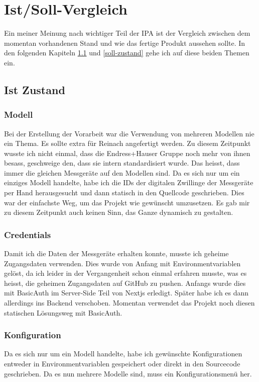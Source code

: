 \section{Ist/Soll-Vergleich}
Ein meiner Meinung nach wichtiger Teil der IPA ist der Vergleich zwischen dem momentan vorhandenen Stand und wie das fertige Produkt aussehen sollte. In den folgenden Kapiteln \ref{ist-zustand} und \ref{soll-zustand} gehe ich auf diese beiden Themen ein.
\subsection{Ist Zustand} \label{ist-zustand}
\subsubsection{Modell}
Bei der Erstellung der Vorarbeit war die Verwendung von mehreren Modellen nie ein Thema. Es sollte extra für Reinach angefertigt werden. Zu diesem Zeitpunkt wusste ich nicht einmal, dass die Endress+Hauser Gruppe noch mehr von ihnen besass, geschweige den, dass sie intern standardisiert wurde. Das heisst, dass immer die gleichen Messgeräte auf den Modellen sind.
\newline
Da es sich nur um ein einziges Modell handelte, habe ich die IDs der digitalen Zwillinge der Messgeräte per Hand herausgesucht und dann statisch in den Quellcode geschrieben. Dies war der einfachste Weg, um das Projekt wie gewünscht umzusetzen. Es gab mir zu diesem Zeitpunkt auch keinen Sinn, das Ganze dynamisch zu gestalten.
\subsubsection{Credentials}
Damit ich die Daten der Messgeräte erhalten konnte, musste ich geheime Zugangsdaten verwenden. Dies wurde von Anfang mit Environmentvariablen gelöst, da ich leider in der Vergangenheit schon einmal erfahren musste, was es heisst, die geheimen Zugangsdaten auf GitHub zu pushen. Anfangs wurde dies mit BasicAuth im Server-Side Teil von Nextjs erledigt. Später habe ich es dann allerdings ins Backend verschoben. Momentan verwendet das Projekt noch diesen statischen Lösungsweg mit BasicAuth.
\subsubsection{Konfiguration}
Da es sich nur um ein Modell handelte, habe ich gewünschte Konfigurationen entweder in Environmentvariablen gespeichert oder direkt in den Sourcecode geschrieben. Da es nun mehrere Modelle sind, muss ein Konfigurationsmenü her.
